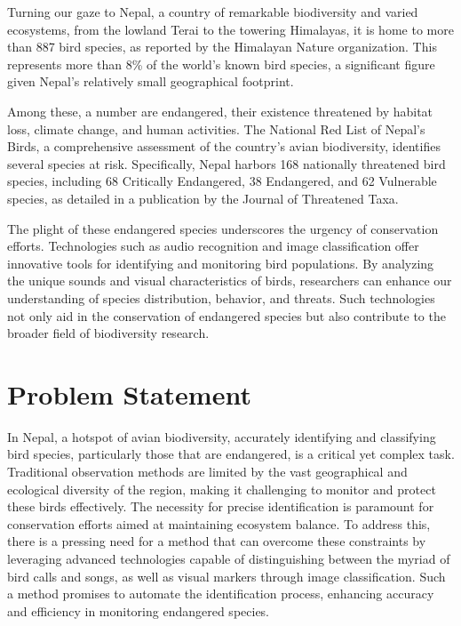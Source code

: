 Turning our gaze to Nepal, a country of remarkable biodiversity and varied ecosystems, from the lowland Terai to the towering Himalayas, it is home to more than 887 bird species, as reported by the Himalayan Nature organization. This represents more than 8\% of the world's known bird species, a significant figure given Nepal's relatively small geographical footprint.\cite{himalayan}

Among these, a number are endangered, their existence threatened by habitat loss, climate change, and human activities. The National Red List of Nepal's Birds, a comprehensive assessment of the country's avian biodiversity, identifies several species at risk. Specifically, Nepal harbors 168 nationally threatened bird species, including 68 Critically Endangered, 38 Endangered, and 62 Vulnerable species, as detailed in a publication by the Journal of Threatened Taxa.\cite{inskipp2017nepala}

The plight of these endangered species underscores the urgency of conservation efforts. Technologies such as audio recognition and image classification offer innovative tools for identifying and monitoring bird populations. By analyzing the unique sounds and visual characteristics of birds, researchers can enhance our understanding of species distribution, behavior, and threats. Such technologies not only aid in the conservation of endangered species but also contribute to the broader field of biodiversity research.

  
\section{Problem Statement}
In Nepal, a hotspot of avian biodiversity, accurately identifying and classifying bird species, particularly those that are endangered, is a critical yet complex task. Traditional observation methods are limited by the vast geographical and ecological diversity of the region, making it challenging to monitor and protect these birds effectively. The necessity for precise identification is paramount for conservation efforts aimed at maintaining ecosystem balance. To address this, there is a pressing need for a method that can overcome these constraints by leveraging advanced technologies capable of distinguishing between the myriad of bird calls and songs, as well as visual markers through image classification. Such a method promises to automate the identification process, enhancing accuracy and efficiency in monitoring endangered species.


